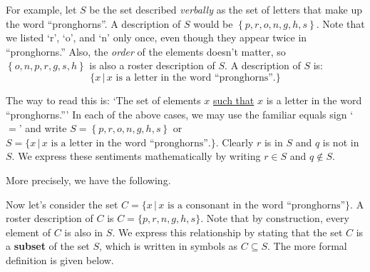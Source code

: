 For example, let $S$ be the set described \textit{verbally} as the set of letters that make up the word ``pronghorns''.  A   description of $S$ would be  $\left\{ p, r, o, n, g, h, s \right\}$. Note that we listed `r', `o', and `n' only once, even though they appear twice in ``pronghorns.''  Also, the \textit{order} of the elements doesn't matter, so $\left\{ o, n, p, r, g, s, h \right\}$ is also a roster description of $S$.   A  description of $S$ is: \[ \{ x \, | \, \mbox{$x$ is a
letter in the word ``pronghorns''.}\} \]

The way to read this is: `The set of elements $x$ \underline{such that} $x$ is a letter in the word ``pronghorns.'''   In each of the above cases, we may use the familiar equals sign `$=$' and write  $S = \left\{  p, r, o, n, g, h, s  \right\}$ or $S = \{ x \, | \, \mbox{$x$ is a
letter in the word ``pronghorns''.}\}$.  Clearly $r$ is in $S$ and $q$ is not in $S$.  We express these sentiments mathematically by writing  $r \in S$ and $q \notin S$. 

More precisely, we have the following.

\medskip


\medskip

Now let's consider the set $C =  \{ x \, | \, \mbox{$x$ is a consonant in the word ``pronghorns''}\}$.  A roster description of $C$ is  $C = \{ p, r, n, g, h, s\}$.  Note that by construction, every element of $C$ is also in $S$.  We express this relationship by stating that the set $C$ is a \textbf{subset} of the set $S$, which is written in symbols as $C \subseteq S$.  The more formal definition is given below.

\medskip


